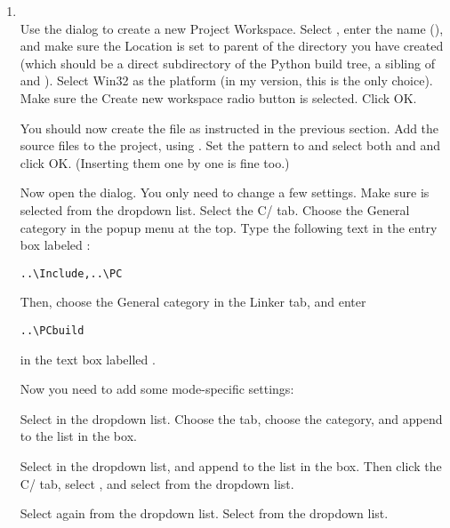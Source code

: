 \begin{enumerate}
  \item
  \\
    Use the  dialog to
    create a new Project Workspace.  Select , enter the name (), and
    make sure the Location is set to parent of the 
    directory you have created (which should be a direct subdirectory
    of the Python build tree, a sibling of  and
    ).  Select Win32 as the platform (in my version, this is
    the only choice).  Make sure the Create new workspace radio button
    is selected.  Click OK.

    You should now create the file  as instructed in
    the previous section. Add the source files to the project, using
    . Set the pattern to
     and select both  and  and
    click OK.  (Inserting them one by one is fine too.)

    Now open the  dialog.
    You only need to change a few settings.  Make sure  is selected from the 
    dropdown list.  Select the C/\Cpp{} tab.  Choose the General
    category in the popup menu at the top.  Type the following text in
    the entry box labeled :

\begin{verbatim}
..\Include,..\PC
\end{verbatim}

    Then, choose the General category in the Linker tab, and enter

\begin{verbatim}
..\PCbuild
\end{verbatim}

    in the text box labelled .

    Now you need to add some mode-specific settings:

    Select  in the 
    dropdown list.  Choose the  tab, choose the
     category, and append  to the
    list in the  box.

    Select  in the  dropdown
    list, and append  to the list in the
     box.  Then click the C/\Cpp{}
    tab, select , and select
     from the  dropdown list.

    Select  again from the 
    dropdown list.  Select  from the
     dropdown list.
\end{enumerate}


